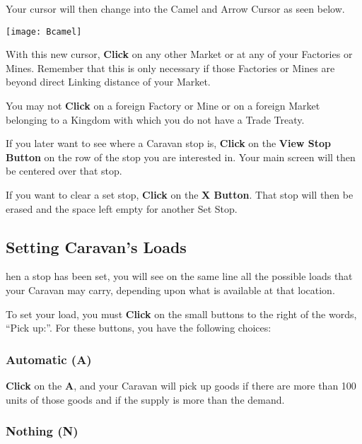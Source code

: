 
Your cursor will then change into the Camel and Arrow Cursor as seen below.

\texttt{[image: Bcamel]}

With this new cursor, \textbf{Click} on any other Market or at any of your Factories or Mines. Remember that this is only necessary if those Factories or Mines are beyond direct Linking distance of your Market.

You may not \textbf{Click} on a foreign Factory or Mine or on a foreign Market belonging to a Kingdom with which you do not have a Trade Treaty.


If you later want to see where a Caravan stop is, \textbf{Click} on the \textbf{View Stop Button} on the row of the stop you are interested in. Your main screen will then be centered over that stop.

If you want to clear a set stop, \textbf{Click} on the \textbf{X Button}. That stop will then be erased and the space left empty for another Set Stop.

\subsection{\textsf{Setting Caravan’s Loads}}


hen a stop has been set, you will see on the same line all the possible loads that your Caravan may carry, depending upon what is available at that location.


To set your load, you must \textbf{Click} on the small buttons to the right of the words, “Pick up:”. For these buttons, you have the following choices:

\subsubsection{\textsf{Automatic (A)}}


\textbf{Click} on the \textbf{A}, and your Caravan will pick up goods if there are more than 100 units of those goods and if the supply is more than the demand.

\subsubsection{\textsf{Nothing (N)}}

